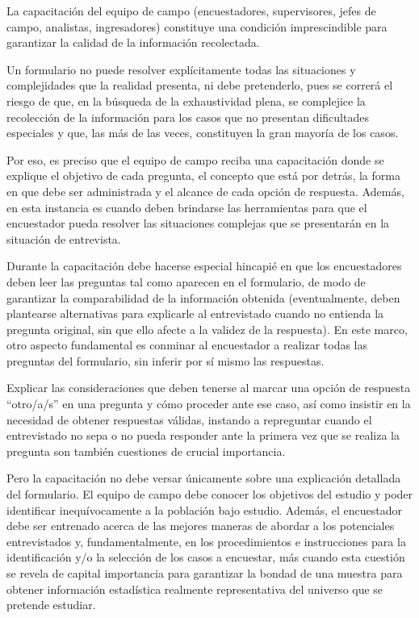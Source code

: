 \documentclass[
]{book}
\begin{document}
La capacitación del equipo de campo (encuestadores, supervisores, jefes de campo, analistas, ingresadores) constituye una condición imprescindible para garantizar la calidad de la información recolectada.

\hfill\break
Un formulario no puede resolver explícitamente todas las situaciones y complejidades que la realidad presenta, ni debe pretenderlo, pues se correrá el riesgo de que, en la búsqueda de la exhaustividad plena, se complejice la recolección de la información para los casos que no presentan dificultades especiales y que, las más de las veces, constituyen la gran mayoría de los casos.

Por eso, es preciso que el equipo de campo reciba una capacitación donde se explique el objetivo de cada pregunta, el concepto que está por detrás, la forma en que debe ser administrada y el alcance de cada opción de respuesta. Además, en esta instancia es cuando deben brindarse las herramientas para que el encuestador pueda resolver las situaciones complejas que se presentarán en la situación de entrevista.

Durante la capacitación debe hacerse especial hincapié en que los encuestadores deben leer las preguntas tal como aparecen en el formulario, de modo de garantizar la comparabilidad de la información obtenida (eventualmente, deben plantearse alternativas para explicarle al entrevistado cuando no entienda la pregunta original, sin que ello afecte a la validez de la respuesta). En este marco, otro aspecto fundamental es conminar al encuestador a realizar todas las preguntas del formulario, sin inferir por sí mismo las respuestas.

Explicar las consideraciones que deben tenerse al marcar una opción de respuesta ``otro/a/s'' en una pregunta y cómo proceder ante ese caso, así como insistir en la necesidad de obtener respuestas válidas, instando a repreguntar cuando el entrevistado no sepa o no pueda responder ante la primera vez que se realiza la pregunta son también cuestiones de crucial importancia.

\hfill\break
Pero la capacitación no debe versar únicamente sobre una explicación detallada del formulario. El equipo de campo debe conocer los objetivos del estudio y poder identificar inequívocamente a la población bajo estudio. Además, el encuestador debe ser entrenado acerca de las mejores maneras de abordar a los potenciales entrevistados y, fundamentalmente, en los procedimientos e instrucciones para la identificación y/o la selección de los casos a encuestar, más cuando esta cuestión se revela de capital importancia para garantizar la bondad de una muestra para obtener información estadística realmente representativa del universo que se pretende estudiar.
\end{document}
